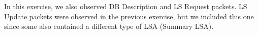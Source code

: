 

In this exercise, we also observed DB Description and LS Request packets. LS Update packets were observed in the previous exercise, but we included this one since some also contained a different type of LSA (Summary LSA). 